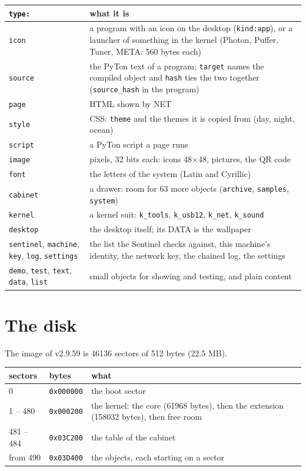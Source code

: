 \documentclass[11pt,a4paper]{article}
\begin{document}
\begin{longtable}{@{}l p{11.5cm}@{}}
\toprule
\texttt{type:} & what it is \\ \midrule
\texttt{icon} & a program with an icon on the desktop (\texttt{kind:app}), or a launcher of
                something in the kernel (Photon, Puffer, Tuner, META: 560 bytes each) \\
\texttt{source} & the PyTon text of a program; \texttt{target} names the compiled object and
                \texttt{hash} ties the two together (\texttt{source\_hash} in the program) \\
\texttt{page} & HTML shown by NET \\
\texttt{style} & CSS: \texttt{theme} and the themes it is copied from (day, night, ocean) \\
\texttt{script} & a PyTon script a page runs \\
\texttt{image} & pixels, 32 bits each: icons 48$\times$48, pictures, the QR code \\
\texttt{font} & the letters of the system (Latin and Cyrillic) \\
\texttt{cabinet} & a drawer: room for 63 more objects (\texttt{archive}, \texttt{samples},
                \texttt{system}) \\
\texttt{kernel} & a kernel suit: \texttt{k\_tools}, \texttt{k\_usb12}, \texttt{k\_net},
                \texttt{k\_sound} \\
\texttt{desktop} & the desktop itself; its DATA is the wallpaper \\
\texttt{sentinel}, \texttt{machine}, \texttt{key}, \texttt{log}, \texttt{settings} &
                the list the Sentinel checks against, this machine's identity, the network key,
                the chained log, the settings \\
\texttt{demo}, \texttt{test}, \texttt{text}, \texttt{data}, \texttt{list} & small objects for
                showing and testing, and plain content \\
\bottomrule
\end{longtable}

\section{The disk}

The image of v2.9.59 is 46136 sectors of 512 bytes (22.5 MB).

\begin{longtable}{@{}l l p{9cm}@{}}
\toprule
sectors & bytes & what \\ \midrule
0 & \texttt{0x000000} & the boot sector \\
1 -- 480 & \texttt{0x000200} & the kernel: the core (61968 bytes), then the extension
                               (158032 bytes), then free room \\
481 -- 484 & \texttt{0x03C200} & the table of the cabinet \\
from 490 & \texttt{0x03D400} & the objects, each starting on a sector \\
\bottomrule
\end{longtable}
\end{document}

